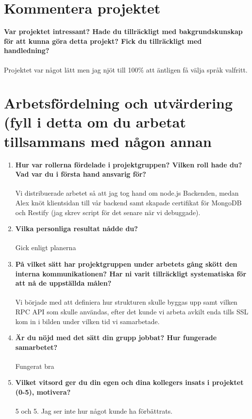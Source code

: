 \documentclass[swedish,a4paper]{article}
\title{\TITLE}
\author{\AUTHOR}
\begin{document}
\maketitle

\section{Kommentera projektet}
\textbf{Var projektet intressant? Hade du tillräckligt med bakgrundskunskap för att kunna göra detta projekt? Fick du tillräckligt med handledning?}
\\
\\
Projektet var något lätt men jag njöt till 100\% att äntligen få välja språk
valfritt.

\section{Arbetsfördelning och utvärdering (fyll i detta om du arbetat tillsammans med
någon annan}

\begin{enumerate}
  \item \textbf{Hur var rollerna fördelade i projektgruppen? Vilken roll hade du? Vad var du i första hand ansvarig för?}\\
    \\
    Vi distribuerade arbetet så att jag tog hand om node.js Backenden, medan
    Alex knöt klientsidan till vår backend samt skapade certifikat för MongoDB
    och Restify (jag skrev script för det senare när vi debuggade).
  \item \textbf{Vilka personliga resultat nådde du?}\\
    \\
    Gick enligt planerna
  \item \textbf{På vilket sätt har projektgruppen under arbetets gång skött den
    interna kommunikationen? Har ni varit tillräckligt systematiska för att nå
  de uppställda målen?} \\
    \\
    Vi började med att definiera hur strukturen skulle byggas upp samt
    vilken RPC API som skulle användas, efter det kunde vi arbeta avkilt enda
    tills SSL kom in i bilden under vilken tid vi samarbetade.
  \item \textbf{Är du nöjd med det sätt din grupp jobbat? Hur fungerade
    samarbetet?}\\
    \\
    Fungerat bra
  \item \textbf{Vilket vitsord ger du din egen och dina kollegers insats i
    projektet (0-5), motivera?}\\
    \\
    5 och 5. Jag ser inte hur något kunde ha förbättrats.
\end{enumerate}
\end{document}
